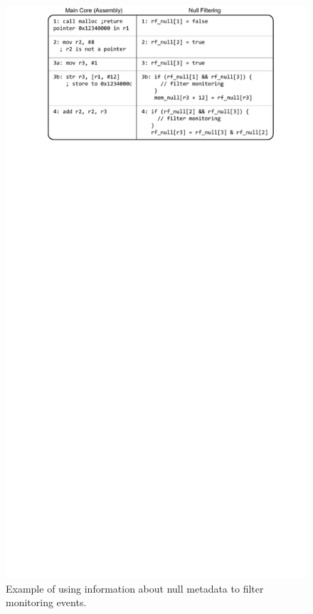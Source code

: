 \begin{figure}
  \begin{center}
    \includegraphics{monitoring_dift_drop/figs/example_null_filtering.pdf}
    \caption{Example of using information about null metadata to filter monitoring events.}
    \label{fig:monitoring_dift_drop.dropping.example_null} 
  \end{center}
\end{figure}

